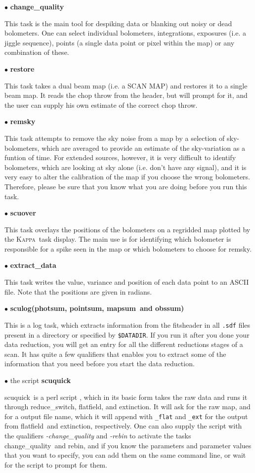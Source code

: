 \documentclass[twoside,11pt]{article}
\newcommand{\Kappa}{\xref{\textsc{Kappa}}{sun95}{}}
\newcommand{\task}[1]{\textsf{#1}}
\newcommand{\rebin}{\xref{\task{rebin}}{sun216}{REBIN}}
\newcommand{\chgqual}{\xref{\task{change\_\-qua\-lity}}{sun216}{CHANGE_QUALITY}}
\newcommand{\resw}{\xref{\task{reduce\_switch}}{sun216}{REDUCE_SWITCH}}
\newcommand{\flatf}{\xref{\task{flatfield}}{sun216}{FLATFIELD}}
\newcommand{\ext}{\xref{\task{extinction}}{sun216}{EXTINCTION}}
\newcommand{\scuquick}{\xref{\task{scuquick}}{sun216}{SCUQUICK}}
\newcommand{\remsky}{\xref{\task{remsky}}{sun216}{REMSKY}}
\newcommand{\scuover}{\xref{\task{scuover}}{sun216}{SCUOVER}}
\newcommand{\extdata}{\xref{\task{extract\_data}}{sun216}{EXTRACT_DATA}}
\newcommand{\sculog}{\xref{\task{sculog}}{sun216}{SCULOG}}
\newcommand{\photsum}{\xref{\task{photsum}}{sun216}{PHOTSUM}}
\newcommand{\mapsum}{\xref{\task{mapsum}}{sun216}{MAPSUM}}
\newcommand{\pointsum}{\xref{\task{pointsum}}{sun216}{POINTSUM}}
\newcommand{\restore}{\xref{\task{restore}}{sun216}{RESTORE}}
\newcommand{\obssum}{\xref{\task{obssum}}{sun216}{OBSSUM}}
\newcommand{\display}{\xref{\task{display}}{sun95}{DISPLAY}}
\newcommand{\xref}[3]{#1}
\begin{document}
$\bullet$ \textbf{\chgqual}

This task is the main tool for despiking data or blanking out noisy or
dead bolometers. One can select individual bolometers, integrations,
exposures (i.e. a jiggle sequence), points (a single data point or pixel
within the map) or any combination of these.

$\bullet$ \textbf{\restore}

This task takes a dual beam map (i.e. a SCAN MAP) and restores it to
a single beam map. It reads the chop throw from the header, but will
prompt for it, and the user can supply his own estimate of the correct
chop throw.

$\bullet$ \textbf{\remsky}

This task attempts to remove the sky noise from a map by a selection
of sky-bolometers, which are averaged to provide an estimate of the
sky-variation as a funtion of time. For extended sources, however,
it is very difficult to identify bolometers, which are looking at sky
alone (i.e. don't have any signal), and it is very easy to alter the
calibration of the map if you choose the wrong bolometers. Therefore,
please be sure that you know what you are doing before you run this
task.

$\bullet$ \textbf{\scuover}

This task overlays the positions of the bolometers
on a regridded map plotted by the \Kappa\ task \display. The main use is for
identifying which bolometer is responsible for a spike seen in the map or
which bolometers to choose for \remsky.

$\bullet$ \textbf{\extdata}

This task writes the value, variance and position of each data point to
an ASCII file. Note that the positions are given in radians.

$\bullet$ \textbf{\sculog (\photsum, \pointsum, \mapsum\ and \obssum)}

This is a log task, which extracts information from the fitsheader in all
\texttt{.sdf} files present in a directory or specified by
\texttt{\$DATADIR}. If you run it after you done your data reduction, you will
get an entry for all the different reductions stages of a scan. It has quite a
few qualifiers that enables you to extract some of the information that you
need before you start the data reduction.

$\bullet$ the script \textbf{\scuquick}

\scuquick\ is a perl script \cite{perl}, which in its basic form takes the raw
data and runs it through \resw, \flatf, and
\ext. It will ask for the raw map, and for a output file name,
which it will append with \texttt{\_flat} and \texttt{\_ext} for the output from
\flatf\ and \ext, respectively. One can also supply
the script with the qualifiers {\it -change\_quality} and {\it -rebin} to
activate the tasks \chgqual\ and \rebin, and if you know
the parameters and parameter values that you want to specify, you can add
them on the same command line, or wait for the script to prompt for them.
\end{document}
